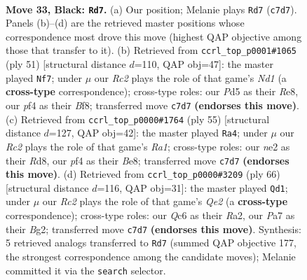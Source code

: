 \documentclass[11pt]{article}
\begin{document}
\clearpage

\begin{figure}[p]\centering
\begin{subfigure}{0.46\textwidth}\centering
\resizebox{\linewidth}{!}{%
\newchessgame
\chessboard[
  setfen={7r/pbr1bk1p/n1q3pP/1p1p1pP1/3P1P2/1P2P3/4N3/R2QKBNR b KQ - 13 33},
  showmover=false,
  pgfstyle=straightmove, color=movearrow, markmove={c7-d7}
]}
\caption{}
\end{subfigure}\hfill
\begin{subfigure}{0.46\textwidth}\centering
\resizebox{\linewidth}{!}{%
\newchessgame
\chessboard[
  setfen={3nrbk1/pp1q3p/2p1bpp1/8/2pP1BPP/2P1N3/PP2QPN1/R5K1 b - - 1 26},
  showmover=false,
  pgfstyle=straightmove, color=movearrow, markmove={d8-f7}
]}
\caption{}
\end{subfigure}
\\[4pt]
\begin{subfigure}{0.46\textwidth}\centering
\resizebox{\linewidth}{!}{%
\newchessgame
\chessboard[
  setfen={r2rbbk1/1p2qpn1/2p3pp/3pP3/1P1N1P2/3BP2P/3QN1P1/1R3R1K b - - 6 28},
  showmover=false,
  pgfstyle=straightmove, color=movearrow, markmove={a8-a4}
]}
\caption{}
\end{subfigure}\hfill
\begin{subfigure}{0.46\textwidth}\centering
\resizebox{\linewidth}{!}{%
\newchessgame
\chessboard[
  setfen={6k1/2r1bpp1/1pq1nn1p/p2p4/P6P/1P2PNP1/R3QPB1/4B1K1 w - - 1 34},
  showmover=false,
  pgfstyle=straightmove, color=movearrow, markmove={e2-d1}
]}
\caption{}
\end{subfigure}
\caption{\textbf{Move 33, Black: \texttt{Rd7}.} (a) Our position; Melanie plays \texttt{Rd7} (\texttt{c7d7}). Panels (b)--(d) are the retrieved master positions whose correspondence most drove this move (highest QAP objective among those that transfer to it). (b) Retrieved from \texttt{ccrl\_top\_p0001\#1065} (ply 51) [structural distance $d$=110, QAP obj=47]: the master played \texttt{Nf7}; under $\mu$ our \emph{Rc2} plays the role of that game's \emph{Nd1} (a \textbf{cross-type} correspondence); cross-type roles: our \emph{P}d5 as their \emph{R}e8, our \emph{p}f4 as their \emph{B}f8; transferred move \texttt{c7d7} \textbf{(endorses this move)}. (c) Retrieved from \texttt{ccrl\_top\_p0000\#1764} (ply 55) [structural distance $d$=127, QAP obj=42]: the master played \texttt{Ra4}; under $\mu$ our \emph{Rc2} plays the role of that game's \emph{Ra1}; cross-type roles: our \emph{n}e2 as their \emph{R}d8, our \emph{p}f4 as their \emph{B}e8; transferred move \texttt{c7d7} \textbf{(endorses this move)}. (d) Retrieved from \texttt{ccrl\_top\_p0000\#3209} (ply 66) [structural distance $d$=116, QAP obj=31]: the master played \texttt{Qd1}; under $\mu$ our \emph{Rc2} plays the role of that game's \emph{Qe2} (a \textbf{cross-type} correspondence); cross-type roles: our \emph{Q}c6 as their \emph{R}a2, our \emph{P}a7 as their \emph{B}g2; transferred move \texttt{c7d7} \textbf{(endorses this move)}. Synthesis: 5 retrieved analogs transferred to \texttt{Rd7} (summed QAP objective 177, the strongest correspondence among the candidate moves); Melanie committed it via the \texttt{search} selector.}
\label{fig:thought-m65}
\end{figure}
\end{document}
